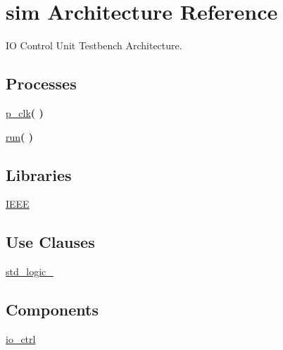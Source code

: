 \hypertarget{classio__ctrl_1_1sim}{}\section{sim Architecture Reference}
\label{classio__ctrl_1_1sim}


IO Control Unit Testbench Architecture.  


\subsection*{Processes}
 \begin{DoxyCompactItemize}
\item 
\mbox{\label{classio__ctrl_1_1sim_af35c81fcf5e4601a4e5d669b422cf79a}} 
\hyperlink{classio__ctrl_1_1sim_af35c81fcf5e4601a4e5d669b422cf79a}{p\+\_\+clk}{\bfseries  (  )}
\item 
\mbox{\label{classio__ctrl_1_1sim_a0f40b896b2461e250ebafd4e27b8ff54}} 
\hyperlink{classio__ctrl_1_1sim_a0f40b896b2461e250ebafd4e27b8ff54}{run}{\bfseries  (  )}
\end{DoxyCompactItemize}
\subsection*{Libraries}
 \begin{DoxyCompactItemize}
\item 
\mbox{\label{classio__ctrl_1_1sim_ae4f03c286607f3181e16b9aa12d0c6d4}} 
\hyperlink{classio__ctrl_1_1sim_ae4f03c286607f3181e16b9aa12d0c6d4}{I\+E\+EE} 
\end{DoxyCompactItemize}
\subsection*{Use Clauses}
 \begin{DoxyCompactItemize}
\item 
\mbox{\label{classio__ctrl_1_1sim_acd03516902501cd1c7296a98e22c6fcb}} 
\hyperlink{classio__ctrl_1_1sim_acd03516902501cd1c7296a98e22c6fcb}{std\+\_\+logic\+\_}   
\end{DoxyCompactItemize}
\subsection*{Components}
 \begin{DoxyCompactItemize}
\item 
\mbox{\label{classio__ctrl_1_1sim_a97c813578819a319bf5e8c6d53894fea}} 
\hyperlink{classio__ctrl_1_1sim_a97c813578819a319bf5e8c6d53894fea}{io\+\_\+ctrl}  {\bfseries }  
\end{DoxyCompactItemize}

